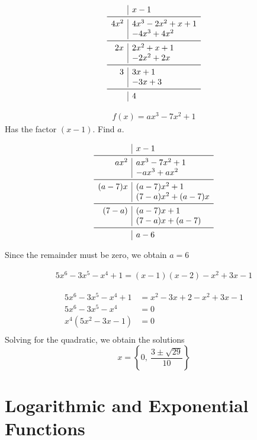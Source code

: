 \documentclass[a4paper]{article}
\begin{document}
\[
\begin{array}{r|l}
& x-1 \\
\midrule
4x^2  & 4x^3 -2x^2 +x +1 \\
& -4x^3 + 4x^2 \\
\midrule
2x & 2x^2 +x +1 \\
& -2x^2 + 2x \\
\midrule
3 & 3x+1 \\
& -3x + 3 \\
\midrule
&4
\end{array}
\]


\begin{question}
\begin{align*}
f(x) = ax^3 -7x^2 +1
\end{align*}
Has the factor \((x-1)\). Find \(a\).
\end{question}

\[
\begin{array}{r|l}
& x-1 \\
\midrule
ax^2 & ax^3 - 7x^2 +1 \\
& -ax^3 + ax^2 \\
\midrule
(a-7)x & (a-7)x^2 +1 \\
& (7-a)x^2 + (a-7)x \\
\midrule
(7-a) & (a-7)x +1 \\
& (7-a)x + (a-7) \\
\midrule
& a -6
\end{array}
\]

Since the remainder must be zero, we obtain \(a=6\)

\begin{question}
\begin{align*}
5x^6 -3x^5 -x^4 +1  = (x-1)(x-2) - x^2 +3x -1
\end{align*}
\end{question}

\begin{align*}
5x^6 -3x^5 -x^4 + 1 &= x^2 -3x +2 -x^2 +3x -1 \\
5x^6 -3x^5 -x^4 &= 0 \\
x^4(5x^2 -3x -1) &= 0 \\
\end{align*}
Solving for the quadratic, we obtain the solutions 
\[
x= \left\{0,\ \frac{3 \pm \sqrt{29}}{10} \right\}
\]

\section{Logarithmic and Exponential Functions}
\end{document}

